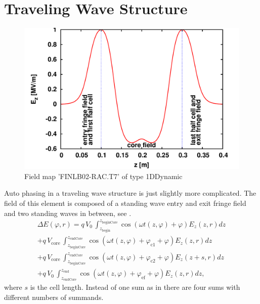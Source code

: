 \section{Traveling Wave Structure}
\begin{figure}
\includegraphics[angle=0,width=0.9\linewidth]{figures/field_crop}
\caption{Field map 'FINLB02-RAC.T7' of type 1DDynamic}
\label{fig:tws}
\end{figure}
Auto phasing in a traveling wave structure is just slightly more complicated. The field of this element is composed of a standing wave entry and exit fringe field and two standing waves in between, see .
\begin{multline}
\Delta E(\varphi,r) = q\, V_{0}\,\int_{z_\text{begin}}^{z_\text{beginCore}} \cos(\omega t(z,\varphi) + \varphi) E_z(z, r) dz \\
+ q\, V_\text{core}\,\int_{z_\text{beginCore}}^{z_\text{endCore}} \cos(\omega t(z,\varphi) + \varphi_\text{c1} + \varphi) E_z(z, r) dz \\
+ q\, V_\text{core}\,\int_{z_\text{beginCore}}^{z_\text{endCore}} \cos(\omega t(z,\varphi) + \varphi_\text{c2} + \varphi) E_z(z + s, r) dz \\
+ q\, V_{0}\,\int_{z_\text{endCore}}^{z_\text{end}} \cos(\omega t(z,\varphi) + \varphi_\text{ef} + \varphi) E_z(z, r) dz,
\end{multline}
where $s$ is the cell length. Instead of one sum as in  there are four sums with different numbers of summands.
